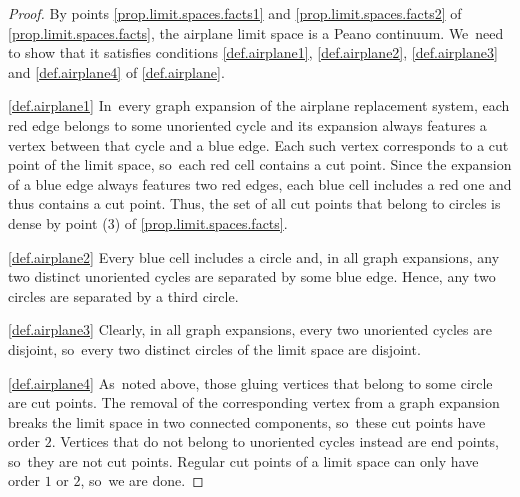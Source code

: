 \documentclass[JEP,XML,SOM,Unicode,NoFloatCountersInSection,published]{cedram}
\theoremstyle{plain}
\theoremstyle{definition}
\theoremstyle{remark}
\begin{document}
\begin{proof}
By points \cref{prop.limit.spaces.facts1} and \cref{prop.limit.spaces.facts2} of \cref{prop.limit.spaces.facts}, the airplane limit space is a Peano continuum. We~need to show that it satisfies conditions \cref{def.airplane1}, \cref{def.airplane2}, \cref{def.airplane3} and \cref{def.airplane4} of \cref{def.airplane}.

\cref{def.airplane1} In~every graph expansion of the airplane replacement system, each red edge belongs to some unoriented cycle and its expansion always features a vertex between that cycle and a blue edge.
Each such vertex corresponds to a cut point of the limit space, so~each red cell contains a cut point.
Since the expansion of a blue edge always features two red edges, each blue cell includes a red one and thus contains a cut point.
Thus, the set of all cut points that belong to circles is dense by point (3) of \cref{prop.limit.spaces.facts}.

\cref{def.airplane2}
Every blue cell includes a circle and, in all graph expansions, any two distinct unoriented cycles are separated by some blue edge.
Hence, any two circles are separated by a third circle.

\cref{def.airplane3}
Clearly, in all graph expansions, every two unoriented cycles are disjoint, so~every two distinct circles of the limit space are disjoint.

\cref{def.airplane4} As~noted above, those gluing vertices that belong to some circle are cut points.
The removal of the corresponding vertex from a graph expansion breaks the limit space in two connected components, so~these cut points have order $2$.
Vertices that do not belong to unoriented cycles instead are end points, so~they are not cut points.
Regular cut points of a limit space can only have order $1$ or $2$, so~we are done.
\end{proof}

\backmatter


\end{document}
